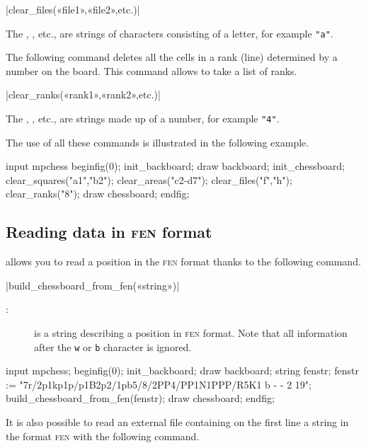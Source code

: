 \documentclass[english]{ltxdoc}
\begin{document}
\commande|clear_files(«file1»,«file2»,etc.)|\smallskip

The \textbf{}, \textbf{}, etc., are strings of characters consisting of a letter, for example \lstinline+"a"+.
\medskip

The following command deletes all the cells in a rank (line) determined by a
number on the board. This command allows to take a list of ranks.

\commande|clear_ranks(«rank1»,«rank2»,etc.)|\smallskip

The \textbf{}, \textbf{}, etc., are strings made up of a number, for example \lstinline+"4"+.

The use of all these commands is illustrated in the following example.

\begin{ExempleMP}
input mpchess
beginfig(0);
init_backboard;
draw backboard;
init_chessboard;
clear_squares("a1","b2");
clear_areas("c2-d7");
clear_files("f","h");
clear_ranks("8");
draw chessboard;
endfig;
\end{ExempleMP}



\subsection{Reading data in \textsc{fen} format}

\mpchess allows you to read a position in the \textsc{fen} format thanks to the following command.

\commande|build_chessboard_from_fen(«string»)|\smallskip

\begin{description}
\item[:] is a string describing a position in
\textsc{fen} format. Note that all information after the 
\texttt{w} or \texttt{b} character is ignored. 
\end{description}

\begin{ExempleMP}
input mpchess;
beginfig(0);
init_backboard;
draw backboard;
string fenstr;
fenstr := "7r/2p1kp1p/p1B2p2/1pb5/8/2PP4/PP1N1PPP/R5K1 b - - 2 19";
build_chessboard_from_fen(fenstr);
draw chessboard;
endfig;
\end{ExempleMP}


It is also possible to read an external file containing on the first line a
string in the format \textsc{fen} with the following command.
\end{document}
